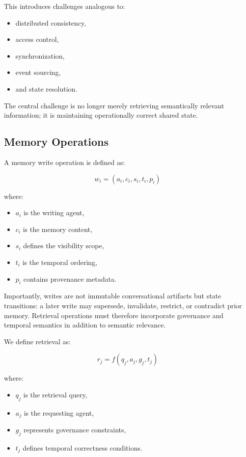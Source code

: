 \documentclass[10pt,twocolumn,letterpaper]{article}
\begin{document}
This introduces challenges analogous to:
\begin{itemize}
    \item distributed consistency,
    \item access control,
    \item synchronization,
    \item event sourcing,
    \item and state resolution.
\end{itemize}

The central challenge is no longer merely retrieving semantically relevant information; it is maintaining operationally correct shared state.

\subsection{Memory Operations}

A memory write operation is defined as:

\[
w_i = (a_i, c_i, s_i, t_i, p_i)
\]

where:
\begin{itemize}
    \item \(a_i\) is the writing agent,
    \item \(c_i\) is the memory content,
    \item \(s_i\) defines the visibility scope,
    \item \(t_i\) is the temporal ordering,
    \item \(p_i\) contains provenance metadata.
\end{itemize}

Importantly, writes are not immutable conversational artifacts but state transitions: a later write may supersede, invalidate, restrict, or contradict prior memory. Retrieval operations must therefore incorporate governance and temporal semantics in addition to semantic relevance.

We define retrieval as:

\[
r_j = f(q_j, a_j, g_j, t_j)
\]

where:
\begin{itemize}
    \item \(q_j\) is the retrieval query,
    \item \(a_j\) is the requesting agent,
    \item \(g_j\) represents governance constraints,
    \item \(t_j\) defines temporal correctness conditions.
\end{itemize}
\end{document}
